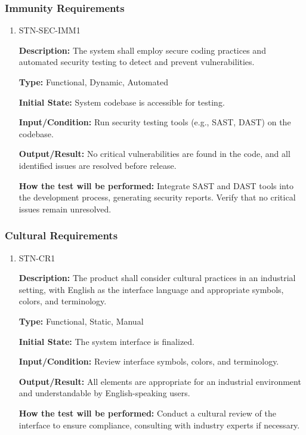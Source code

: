 \documentclass[12pt, titlepage]{article}
\begin{document}
\subsubsection{Immunity Requirements}

\begin{enumerate}

\item{STN-SEC-IMM1\\}

\textbf{Description:} The system shall employ secure coding practices and automated security testing to detect and prevent vulnerabilities.

\textbf{Type:} Functional, Dynamic, Automated

\textbf{Initial State:} System codebase is accessible for testing.

\textbf{Input/Condition:} Run security testing tools (e.g., SAST, DAST) on the codebase.

\textbf{Output/Result:} No critical vulnerabilities are found in the code, and all identified issues are resolved before release.

\textbf{How the test will be performed:} Integrate SAST and DAST tools into the development process, generating security reports. Verify that no critical issues remain unresolved.

\end{enumerate}

\subsubsection{Cultural Requirements}

\begin{enumerate}

\item{STN-CR1\\}

\textbf{Description:} The product shall consider cultural practices in an industrial setting, with English as the interface language and appropriate symbols, colors, and terminology.

\textbf{Type:} Functional, Static, Manual

\textbf{Initial State:} The system interface is finalized.

\textbf{Input/Condition:} Review interface symbols, colors, and terminology.

\textbf{Output/Result:} All elements are appropriate for an industrial environment and understandable by English-speaking users.

\textbf{How the test will be performed:} Conduct a cultural review of the interface to ensure compliance, consulting with industry experts if necessary.

\end{enumerate}
\end{document}
